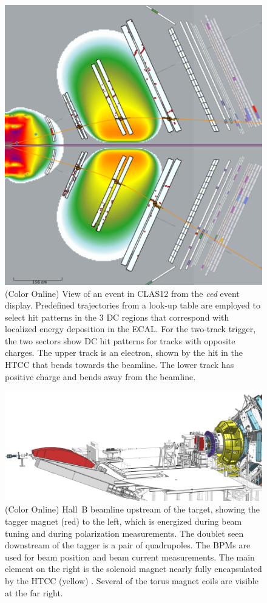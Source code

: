 \documentclass[final,3p,twocolumn]{elsarticle}
\begin{document}
\begin{figure}[t!]
\centerline{\includegraphics[width=0.95\columnwidth]{trigger.png}}
\caption{(Color Online) View of an event in CLAS12 from the {\it ced} event display. Predefined trajectories from a look-up
  table are employed to select hit patterns in the 3 DC regions that correspond with localized energy deposition
  in the ECAL. For the two-track trigger, the two sectors show DC hit patterns for tracks with opposite charges.
  The upper track is an electron, shown by the hit in the HTCC that bends towards the beamline. The lower track
  has positive charge and bends away from the beamline.}
\label{trigger}
\end{figure}
\begin{figure}[t!]
\centerline{\includegraphics[width=1.8\columnwidth]{beamline-1.png}}
\caption{(Color Online) Hall~B beamline upstream of the target, showing the tagger magnet (red) to the left, which is energized
  during beam tuning and during polarization measurements. The doublet seen downstream of the tagger is a pair
  of quadrupoles. The BPMs are used for beam position and beam current measurements. The
  main element on the right is the solenoid magnet nearly fully encapsulated by the HTCC (yellow) . Several of the torus
  magnet coils are visible at the far right.}
\label{beamline}
\end{figure}
\end{document}
